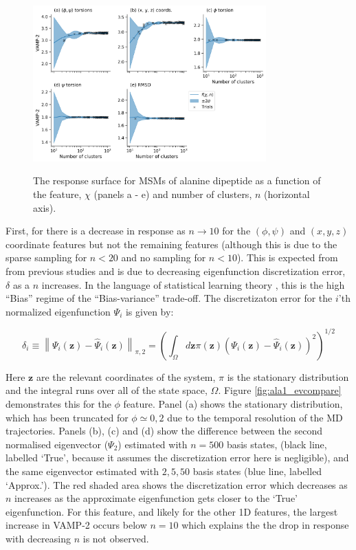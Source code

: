 \begin{figure}[!ht]
    \centering
    \caption{The response surface for MSMs of alanine dipeptide as a function of the feature, $\chi$ (panels a - e) and number of clusters, $n$ (horizontal axis).  }
    \includegraphics[width=0.8\textwidth]{chapters/msm_optimization/figures/ala1_response_surface.png}
    \label{fig:ala1_response}
\end{figure}

First, for there is a decrease in response as $n \rightarrow 10$ for the $(\phi, \psi)$ and $(x,y,z)$ coordinate features but not the remaining features (although this is due to the sparse sampling for $n<20$ and no sampling for $n<10$). This is expected from from previous studies \cite{wuVariationalApproachLearning2019}\cite{mcgibbonVariationalCrossvalidationSlow2015} and is due to decreasing eigenfunction discretization error, $\delta$  \cite{prinzMarkovModelsMolecular2011} as a $n$ increases. In the language of statistical learning theory \cite{friedman2001elements}, this is the high ``Bias'' regime of the ``Bias-variance'' trade-off. The discretizaton error for the $i$'th normalized eigenfunction $\Psi_{i}$ is given by: 

\begin{equation}
    \delta_{i} \equiv\left\|\Psi_{i}(\mathbf{z})-\hat{\Psi}_{i}(\mathbf{z})\right\|_{\pi, 2}=\left(\int_{\Omega} d \mathbf{z} \pi(\mathbf{z})(\Psi_{i}(\mathbf{z})-\hat{\Psi}_{i}(\mathbf{z}))^{2}\right)^{1 / 2}
\end{equation}

Here $\mathbf{z}$ are the relevant coordinates of the system, $\pi$ is the stationary distribution and the integral runs over all of the state space, $\Omega$. Figure \ref{fig:ala1_evcompare} demonstrates this for the $\phi$ feature. Panel (a) shows the stationary distribution, which has been truncated for $\phi \simeq 0, 2$ due to the temporal resolution of the MD trajectories. Panels (b), (c) and (d) show the difference between the second normalised eigenvector ($\Psi_{2}$) estimated with $n=500$ basis states, (black line, labelled `True', because it assumes the discretization error here is negligible), and the same eigenvector estimated with $2, 5, 50$ basis states (blue line, labelled `Approx.'). The red shaded area shows the discretization error which decreases as $n$ increases as the approximate eigenfunction gets closer to the `True' eigenfunction. For this feature, and likely for the other 1D features, the largest increase in VAMP-2 occurs below $n=10$ which explains the the drop in response with decreasing $n$ is not observed. 

